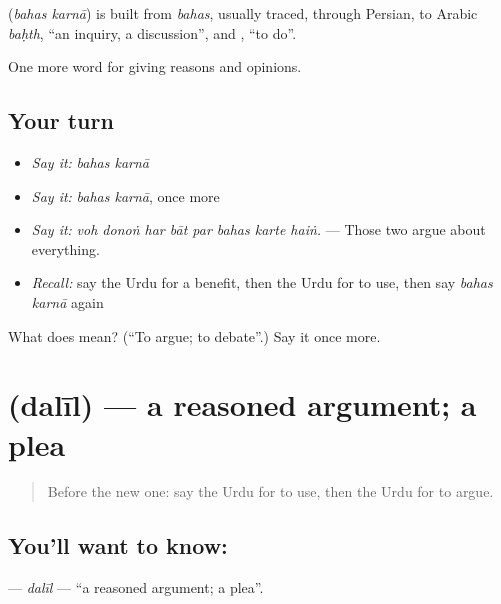 \begin{cousinweb}
\textbf{ } (\emph{bahas karnā}) is built from \emph{bahas}, usually traced, through Persian, to Arabic \emph{baḥth}, \textquotedblleft{}an inquiry, a discussion\textquotedblright{}, and \textbf{}, \textquotedblleft{}to do\textquotedblright{}.
\end{cousinweb}

\begin{grammarlens}[title={What you've built}]
One more word for giving reasons and opinions.
\end{grammarlens}

\subsection*{Your turn}
\begin{itemize}
\raggedright
  \item \emph{Say it:} \emph{bahas karnā}
  \item \emph{Say it:} \emph{bahas karnā}, once more
  \item \emph{Say it:} \emph{voh donoṅ har bāt par bahas karte haiṅ.} — Those two argue about everything.
  \item \emph{Recall:} say the Urdu for a benefit, then the Urdu for to use, then say \emph{bahas karnā} again
\end{itemize}

\begin{tcolorbox}[breakable,colback=teal!4,colframe=teal!35!black,title={Before you move on}]
What does   mean? (\textquotedblleft{}To argue; to debate\textquotedblright{}.) Say it once more.
\end{tcolorbox}
\section[\texorpdfstring{\ur{دلیل} (dalīl)}{دلیل (dalīl)}]{ (dalīl) — a reasoned argument; a plea}

\label{lesson:UR-C334-dalil}



\begin{quote}
Before the new one: say the Urdu for to use, then the Urdu for to argue.
\end{quote}

\subsection*{You'll want to know: }
\textbf{} — \emph{dalīl} — \textquotedblleft{}a reasoned argument; a plea\textquotedblright{}.

